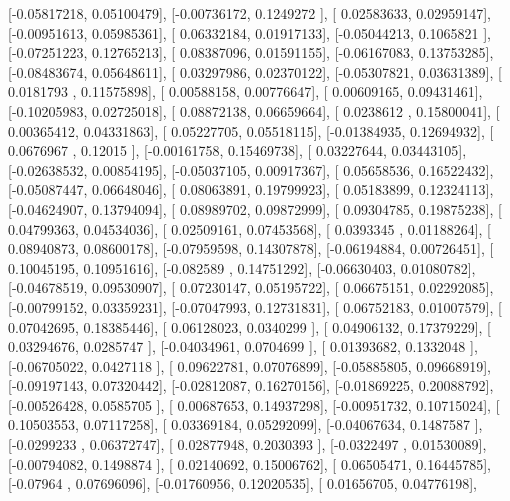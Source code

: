 \documentclass{article}
\begin{document}
       [-0.05817218,  0.05100479],
       [-0.00736172,  0.1249272 ],
       [ 0.02583633,  0.02959147],
       [-0.00951613,  0.05985361],
       [ 0.06332184,  0.01917133],
       [-0.05044213,  0.1065821 ],
       [-0.07251223,  0.12765213],
       [ 0.08387096,  0.01591155],
       [-0.06167083,  0.13753285],
       [-0.08483674,  0.05648611],
       [ 0.03297986,  0.02370122],
       [-0.05307821,  0.03631389],
       [ 0.0181793 ,  0.11575898],
       [ 0.00588158,  0.00776647],
       [ 0.00609165,  0.09431461],
       [-0.10205983,  0.02725018],
       [ 0.08872138,  0.06659664],
       [ 0.0238612 ,  0.15800041],
       [ 0.00365412,  0.04331863],
       [ 0.05227705,  0.05518115],
       [-0.01384935,  0.12694932],
       [ 0.0676967 ,  0.12015   ],
       [-0.00161758,  0.15469738],
       [ 0.03227644,  0.03443105],
       [-0.02638532,  0.00854195],
       [-0.05037105,  0.00917367],
       [ 0.05658536,  0.16522432],
       [-0.05087447,  0.06648046],
       [ 0.08063891,  0.19799923],
       [ 0.05183899,  0.12324113],
       [-0.04624907,  0.13794094],
       [ 0.08989702,  0.09872999],
       [ 0.09304785,  0.19875238],
       [ 0.04799363,  0.04534036],
       [ 0.02509161,  0.07453568],
       [ 0.0393345 ,  0.01188264],
       [ 0.08940873,  0.08600178],
       [-0.07959598,  0.14307878],
       [-0.06194884,  0.00726451],
       [ 0.10045195,  0.10951616],
       [-0.082589  ,  0.14751292],
       [-0.06630403,  0.01080782],
       [-0.04678519,  0.09530907],
       [ 0.07230147,  0.05195722],
       [ 0.06675151,  0.02292085],
       [-0.00799152,  0.03359231],
       [-0.07047993,  0.12731831],
       [ 0.06752183,  0.01007579],
       [ 0.07042695,  0.18385446],
       [ 0.06128023,  0.0340299 ],
       [ 0.04906132,  0.17379229],
       [ 0.03294676,  0.0285747 ],
       [-0.04034961,  0.0704699 ],
       [ 0.01393682,  0.1332048 ],
       [-0.06705022,  0.0427118 ],
       [ 0.09622781,  0.07076899],
       [-0.05885805,  0.09668919],
       [-0.09197143,  0.07320442],
       [-0.02812087,  0.16270156],
       [-0.01869225,  0.20088792],
       [-0.00526428,  0.0585705 ],
       [ 0.00687653,  0.14937298],
       [-0.00951732,  0.10715024],
       [ 0.10503553,  0.07117258],
       [ 0.03369184,  0.05292099],
       [-0.04067634,  0.1487587 ],
       [-0.0299233 ,  0.06372747],
       [ 0.02877948,  0.2030393 ],
       [-0.0322497 ,  0.01530089],
       [-0.00794082,  0.1498874 ],
       [ 0.02140692,  0.15006762],
       [ 0.06505471,  0.16445785],
       [-0.07964   ,  0.07696096],
       [-0.01760956,  0.12020535],
       [ 0.01656705,  0.04776198],
\end{document}
